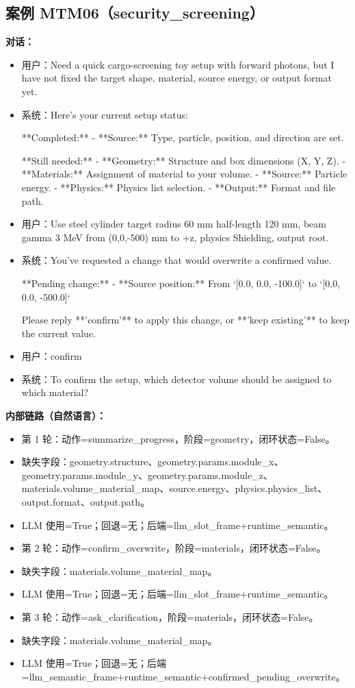 \documentclass[11pt]{ctexart}
\begin{document}
\subsection{案例 MTM06（security\_screening）}
\textbf{对话：}
\begin{itemize}
\item 用户：Need a quick cargo-screening toy setup with forward photons, but I have not fixed the target shape, material, source energy, or output format yet.
\item 系统：Here's your current setup status:

**Completed:**
- **Source:** Type, particle, position, and direction are set.

**Still needed:**
- **Geometry:** Structure and box dimensions (X, Y, Z).
- **Materials:** Assignment of material to your volume.
- **Source:** Particle energy.
- **Physics:** Physics list selection.
- **Output:** Format and file path.
\item 用户：Use steel cylinder target radius 60 mm half-length 120 mm, beam gamma 3 MeV from (0,0,-500) mm to +z, physics Shielding, output root.
\item 系统：You've requested a change that would overwrite a confirmed value.

**Pending change:**
- **Source position:** From `[0.0, 0.0, -100.0]` to `[0.0, 0.0, -500.0]`

Please reply **'confirm'** to apply this change, or **'keep existing'** to keep the current value.
\item 用户：confirm
\item 系统：To confirm the setup, which detector volume should be assigned to which material?
\end{itemize}
\textbf{内部链路（自然语言）：}
\begin{itemize}
\item 第 1 轮：动作=summarize\_progress，阶段=geometry，闭环状态=False。
\item 缺失字段：geometry.structure、geometry.params.module\_x、geometry.params.module\_y、geometry.params.module\_z、materials.volume\_material\_map、source.energy、physics.physics\_list、output.format、output.path。
\item LLM 使用=True；回退=无；后端=llm\_slot\_frame+runtime\_semantic。
\item 第 2 轮：动作=confirm\_overwrite，阶段=materials，闭环状态=False。
\item 缺失字段：materials.volume\_material\_map。
\item LLM 使用=True；回退=无；后端=llm\_slot\_frame+runtime\_semantic。
\item 第 3 轮：动作=ask\_clarification，阶段=materials，闭环状态=False。
\item 缺失字段：materials.volume\_material\_map。
\item LLM 使用=True；回退=无；后端=llm\_semantic\_frame+runtime\_semantic+confirmed\_pending\_overwrite。
\end{itemize}
\end{document}
